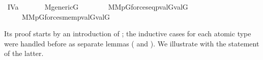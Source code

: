 \begin{isabelle}
  \isamarkupfalse%
  \ IV{}{}{}a{\isacharcolon}\isanewline
  \ \ \isanewline
  \ \ \ \ {\isachardoublequoteopen}M{\isacharunderscore}generic{\isacharparenleft}G{\isacharparenright}{\isachardoublequoteclose}\isanewline
  \ \ \ \isanewline
  \ \ \ \ {\isachardoublequoteopen}{\isacharparenleft}{\isasymtau}{\isasymin}M{\isasymlongrightarrow}{\isasymtheta}{\isasymin}M{\isasymlongrightarrow}{\isacharparenleft}{\isasymforall}p{\isasymin}G{\isachardot}forces{\isacharunderscore}eq{\isacharparenleft}p{\isacharcomma}{\isasymtau}{\isacharcomma}{\isasymtheta}{\isacharparenright}{\isasymlongrightarrow}val{\isacharparenleft}G{\isacharcomma}{\isasymtau}{\isacharparenright}{\isacharequal}val{\isacharparenleft}G{\isacharcomma}{\isasymtheta}{\isacharparenright}{\isacharparenright}{\isacharparenright}{\isasymand}\isanewline
  \ \ \ \ \ {\isacharparenleft}{\isasymtau}{\isasymin}M{\isasymlongrightarrow}{\isasymtheta}{\isasymin}M{\isasymlongrightarrow}{\isacharparenleft}{\isasymforall}p{\isasymin}G{\isachardot}forces{\isacharunderscore}mem{\isacharparenleft}p{\isacharcomma}{\isasymtau}{\isacharcomma}{\isasymtheta}{\isacharparenright}{\isasymlongrightarrow}val{\isacharparenleft}G{\isacharcomma}{\isasymtau}{\isacharparenright}{\isasymin}val{\isacharparenleft}G{\isacharcomma}{\isasymtheta}{\isacharparenright}{\isacharparenright}{\isacharparenright}{\isachardoublequoteclose}
\end{isabelle}
%
Its proof starts by an introduction of ;
the  inductive cases for each atomic type were handled before as
separate lemmas ( and ). We
illustrate with the statement of the latter.
%
